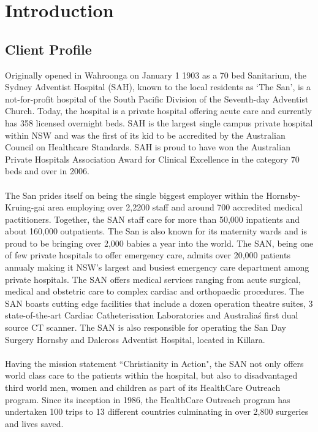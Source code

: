 \section{Introduction}
\subsection{Client Profile}
Originally opened in Wahroonga on January 1 1903 as a 70 bed Sanitarium, the Sydney Adventist Hospital (SAH), known to the local residents as `The San', is a not-for-profit hospital of the South Pacific Division of the Seventh-day Adventist Church.  Today, the hospital is a private hospital offering acute care and currently has 358 licensed overnight beds. SAH is the largest single campus private hospital within NSW and was the first of its kid to be accredited by the Australian Council on Healthcare Standards. SAH is proud to have won the Australian Private Hospitals Association Award for Clinical Excellence in the category 70 beds and over in 2006.
 \\ \\
The San prides itself on being the single biggest employer within the Hornsby-Kruing-gai area employing over 2,2200 staff and around 700 accredited medical pactitioners. Together, the SAN staff care for more than 50,000 inpatients and about 160,000 outpatients. The San is also known for its maternity wards and is proud to be bringing over 2,000 babies a year into the world. The SAN, being one of few private hospitals to offer emergency care, admits over 20,000 patients annualy making it NSW's largest and busiest emergency care department among private hospitals. The SAN offers medical services ranging from acute surgical, medical and obstetric care to complex cardiac and orthopaedic procedures. The SAN boasts cutting edge facilities that include a dozen operation theatre suites, 3 state-of-the-art Cardiac Catheterisation Laboratories and Australia\'s first dual source CT scanner. The SAN is also responsible for operating the San Day Surgery Hornsby and Dalcross Adventist Hospital, located in Killara.
\\ \\
Having the mission statement ``Christianity in Action", the SAN not only offers world class care to the patients within the hospital, but also to disadvantaged third world men, women and children as part of its HealthCare Outreach program. Since its inception in 1986, the HealthCare Outreach program has undertaken 100 trips to 13 different countries culminating in over 2,800 surgeries and lives saved. 
\newpage

